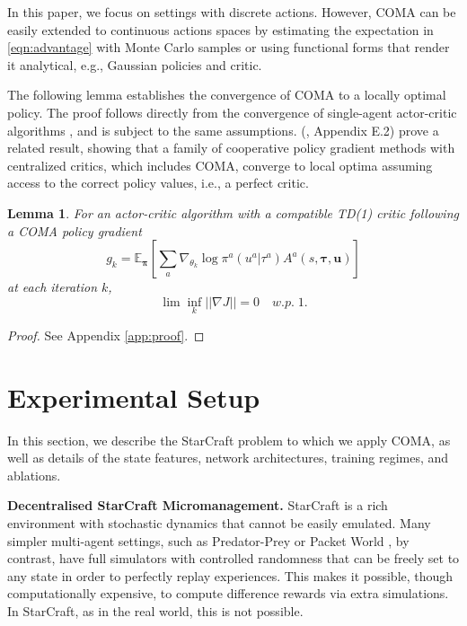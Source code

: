 \documentclass[letterpaper]{article}
\newcommand{\citep}{\cite}
\newcommand{\myvec}[1]{\mathbf{#1}}
\newcommand{\myvecsym}[1]{\boldsymbol{#1}}
\newcommand{\vpi}{\myvecsym{\pi}}
\newcommand{\vtau}{\myvecsym{\tau}}
\newcommand{\vu}{\myvec{u}}
\newcommand{\E}{\mathbb{E}}
\newtheorem{lemma}{Lemma}
\begin{document}
In this paper, we focus on settings with discrete actions. However, COMA can be 
easily extended to continuous actions spaces by estimating the expectation in  
\eqref{eqn:advantage} with Monte Carlo samples or using functional forms that 
render it analytical, e.g., Gaussian policies and critic.

The following lemma establishes the convergence of COMA to a locally optimal policy.  The proof follows directly from the convergence of single-agent actor-critic algorithms \citep{sutton1999policy}, and is subject to the same assumptions. \citeauthor{lyu2024centralizedcriticsmultiagentreinforcement} (\citeyear{lyu2024centralizedcriticsmultiagentreinforcement}, Appendix E.2) prove a related result, showing that a family of cooperative policy gradient methods with centralized critics, which includes COMA, converge to local optima assuming access to the correct policy values, i.e., a perfect critic.

\begin{lemma}
\label{lemma}
For an actor-critic algorithm with a compatible TD(1) critic following a COMA 
policy gradient
\begin{equation}
g_k = \E_{\vpi} \left[ \sum_a \nabla_{\theta_k} \log
\pi^a(u^a | \tau^a)
A^a(s,\vtau, \vu) \right]
\end{equation}
at each iteration $k$,
\begin{equation}
\lim \inf_k ||\nabla J|| = 0 \quad w.p. \; 1.
\end{equation}
\end{lemma}
\begin{proof}
See Appendix \ref{app:proof}.
\end{proof}

\section{Experimental Setup}
\label{sec:setting}

In this section, we describe the StarCraft problem to which we apply COMA, as
well as details of the state features, network architectures, training regimes,
and ablations.

\textbf{Decentralised StarCraft Micromanagement.} StarCraft is a rich
environment with stochastic dynamics that cannot be easily emulated. Many
simpler multi-agent settings, such as Predator-Prey \citep{tan1993multi} or
Packet World \citep{weyns2005packet}, by contrast, have full simulators with
controlled randomness that can be freely set to any state in order to perfectly
replay experiences. This makes it possible, though computationally expensive, to
compute difference rewards via extra simulations. In StarCraft, as in the real
world, this is not possible.
\end{document}
